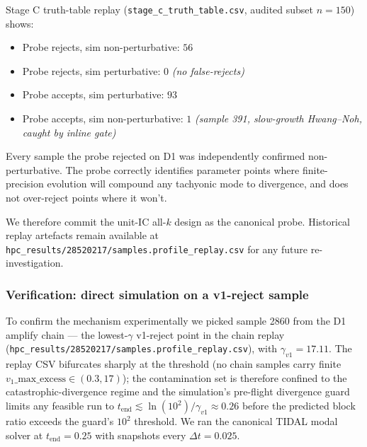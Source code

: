 Stage C truth-table replay (\texttt{stage\_c\_truth\_table.csv},
audited subset $n=150$) shows:
\begin{itemize}
  \item Probe rejects, sim non-perturbative: $56$
  \item Probe rejects, sim perturbative: $0$ \emph{(no false-rejects)}
  \item Probe accepts, sim perturbative: $93$
  \item Probe accepts, sim non-perturbative: $1$ \emph{(sample 391,
    slow-growth Hwang--Noh, caught by inline gate)}
\end{itemize}
Every sample the probe rejected on D1 was independently confirmed
non-perturbative. The probe correctly identifies parameter points
where finite-precision evolution will compound any tachyonic mode to
divergence, and does not over-reject points where it won't.

We therefore commit the unit-IC all-$k$ design as the canonical probe.
Historical replay artefacts remain available at
\texttt{hpc\_results/28520217/samples.profile\_replay.csv} for any
future re-investigation.

\subsubsection{Verification: direct simulation on a v1-reject sample}
\label{sec:ieee-floor-verification}

To confirm the mechanism experimentally we picked sample 2860 from
the D1 amplify chain --- the lowest-$\gamma$ v1-reject point in the
chain replay (\texttt{hpc\_results/28520217/samples.profile\_replay.csv}),
with $\gamma_{v1} = 17.11$. The replay CSV bifurcates sharply at the
threshold (no chain samples carry finite $v_1\_\mathrm{max\_excess}
\in (0.3, 17)$); the contamination set is therefore confined to the
catastrophic-divergence regime and the simulation's pre-flight
divergence guard limits any feasible run to $t_\mathrm{end} \lesssim
\ln(10^2)/\gamma_{v1} \approx 0.26$ before the predicted block ratio
exceeds the guard's $10^2$ threshold. We ran the canonical TIDAL
modal solver at $t_\mathrm{end} = 0.25$ with snapshots every
$\Delta t = 0.025$.

